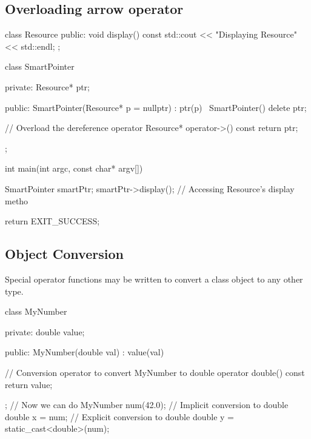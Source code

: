 \documentclass{report}
\begin{document}
    \subsection{Overloading arrow operator}
    \bigbreak \noindent 
    \begin{cppcode}
class Resource {
public:
    void display() const { std::cout << "Displaying Resource" << std::endl; }
};

class SmartPointer {
private:
    Resource* ptr;

public:
    SmartPointer(Resource* p = nullptr) : ptr(p) {}
    ~SmartPointer() { delete ptr; }

    // Overload the dereference operator
    Resource* operator->() const { return ptr; }
};

int main(int argc, const char* argv[]) {
     SmartPointer smartPtr;
    smartPtr->display();  // Accessing Resource's display metho
    
    return EXIT_SUCCESS;
}
    \end{cppcode}

    \bigbreak \noindent 
    \subsection{Object Conversion}
    \bigbreak \noindent 
    \begin{concept}
        Special operator functions may be written to convert a class object to any other type.
    \end{concept}
    \bigbreak \noindent 
    \begin{cppcode}
        class MyNumber {
        private:
            double value;

        public:
            MyNumber(double val) : value(val) {}

            // Conversion operator to convert MyNumber to double
            operator double() const {
                return value;
            }
        };
        // Now we can do
        MyNumber num(42.0);
        // Implicit conversion to double
        double x = num;
        // Explicit conversion to double
        double y = static_cast<double>(num);
    \end{cppcode}
    
\end{document}
